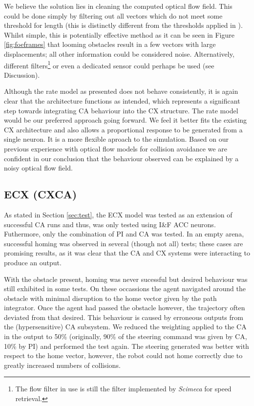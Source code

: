 \documentclass[a4paper,11pt,twoside,openright]{article}
\begin{document}
We believe the solution lies in cleaning the computed optical flow
field. This could be done simply by filtering out all vectors which do
not meet some threshold for length (this is distinctly different from
the thresholds applied in \cite{Mitchell2018}). Whilst simple, this is
potentially effective method as it can be seen in Figure
\ref{fig:foeframes} that looming obstacles result in a few vectors
with large displacements; all other information could be considered
noise. Alternatively, different filters\footnote{The flow filter in
  use is still the filter implemented by \textit{Scimeca} for speed
  retrieval\cite{Scimeca2017,Mitchell2018}. } or even a dedicated
sensor could perhaps be used (see Discussion).\newline\par

Although the rate model as presented does not behave consistently, it
is again clear that the architecture functions as intended, which
represents a significant step towards integrating CA behaviour into the
CX structure.  The rate model would be our preferred approach going
forward. We feel it better fits the existing CX architecture and also
allows a proportional response to be generated from a single
neuron. It is a more flexible aproach to the simulation. Based on our
previous experience with optical flow models for collision avoidance
we are confident in our conclusion that the behaviour observed can be
explained by a noisy optical flow field.

\subsection{ECX (CXCA)}
As stated in Section \ref{sec:test}, the ECX model was tested as an
extension of successful CA runs and thus, was only tested using I\&F
ACC neurons. Futhermore, only the combination of PI and CA was
tested. In an empty arena, successful homing was observed in several
(though not all) tests; these cases are promising results, as it was
clear that the CA and CX systems were interacting to produce an
output. \newline\par

With the obstacle present, homing was never sucessful but desired
behaviour was still exhibited in some tests. On these occassions the
agent navigated around the obstacle with minimal disruption to the
home vector given by the path integrator. Once the agent had passed
the obstacle however, the trajectory often deviated from that
desired. This behaviour is caused by erroneous outputs from the
(hypersensitive) CA subsystem. We reduced the weighting applied to the
CA in the output to 50\% (originally, 90\% of the steering command was
given by CA, 10\% by PI) and performed the test again. The steering
generated was better with respect to the home vector, however, the
robot could not home correctly due to greatly increased numbers of
collisions.
\newline\par
\end{document}
